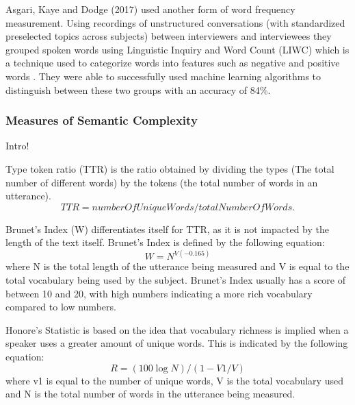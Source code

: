 \par
Asgari, Kaye and Dodge (2017) \cite{Asgari2017} used another form of word frequency measurement. Using recordings of unstructured conversations (with standardized preselected topics across subjects) between interviewers and interviewees they grouped spoken words using Linguistic Inquiry and Word Count (LIWC) which is a technique used to categorize words into features such as negative and positive words \cite{Pennebaker2015}. They were able to successfully used machine learning algorithms to distinguish between these two groups with an accuracy of 84\%.
\subsubsection{Measures of Semantic Complexity}
Intro!

Type token ratio (TTR) is the ratio obtained by dividing the types (The total number of different words) by the tokens (the total number of words in an utterance).
\begin{equation} \label{x1}
TTR = numberOfUniqueWords / totalNumberOfWords.
\end{equation}
\par 
Brunet's Index (W) differentiates itself for TTR, as it is not impacted by the length of the text itself. Brunet's Index is defined by the following equation:
\begin{equation} \label{x2}
W = N^{V(-0.165)}
\end{equation}
where N is the total length of the utterance being measured and V is equal to the total vocabulary being used by the subject. Brunet's Index usually has a score of between 10 and 20, with high numbers indicating a more rich vocabulary compared to low numbers. \newline
\par 
Honore's Statistic is based on the idea that vocabulary richness is implied when a speaker uses a greater amount of unique words. This is indicated by the following equation: 
\begin{equation} \label{x3}
R = (100 \log N) / (1 - V1/V)
\end{equation}
where v1 is equal to the number of unique words, V is the total vocabulary used and N is the total number of words in the utterance being measured.
\par 
